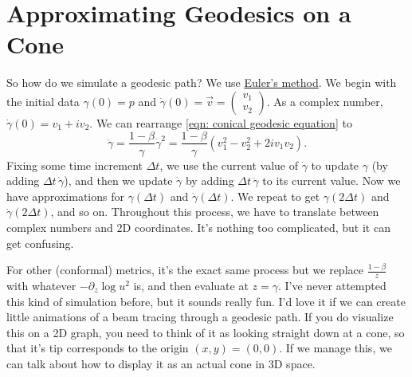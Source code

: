 \documentclass{article}
\begin{document}
\section*{Approximating Geodesics on a Cone}
So how do we simulate a geodesic path?  We use \href{https://en.wikipedia.org/wiki/Euler_method}{Euler's method}.  We begin with the initial data $\gamma(0)=p$ and $\dot\gamma(0)=\vec v=\left(\begin{smallmatrix}v_1\\v_2\end{smallmatrix}\right)$.  As a complex number, $\dot\gamma(0)=v_1+iv_2$.  We can rearrange \eqref{eqn: conical geodesic equation} to
\begin{equation}
    \ddot\gamma=\frac{1-\beta}\gamma\dot\gamma^2=\frac{1-\beta}\gamma\left(v_1^2-v_2^2+2iv_1v_2\right).
\end{equation}
Fixing some time increment $\Delta t$, we use the current value of $\dot\gamma$ to update $\gamma$ (by adding $\Delta t\,\dot\gamma$), and then we update $\dot\gamma$ by adding $\Delta t\,\ddot\gamma$ to its current value.  Now we have approximations for $\gamma(\Delta t)$ and $\dot\gamma(\Delta t)$.  We repeat to get $\gamma(2\Delta t)$ and $\dot\gamma(2\Delta t)$, and so on.  Throughout this process, we have to translate between complex numbers and 2D coordinates.  It's nothing too complicated, but it can get confusing.

For other (conformal) metrics, it's the exact same process but we replace $\frac{1-\beta}z$ with whatever $-\partial_z\log u^2$ is, and then evaluate at $z=\gamma$.  I've never attempted this kind of simulation before, but it sounds really fun.  I'd love it if we can create little animations of a beam tracing through a geodesic path.  If you do visualize this on a 2D graph, you need to think of it as looking straight down at a cone, so that it's tip corresponds to the origin $(x,y)=(0,0)$.  If we manage this, we can talk about how to display it as an actual cone in 3D space.
\end{document}
